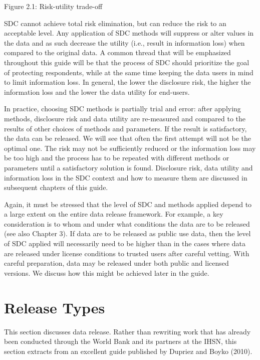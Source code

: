 \documentclass[letterpaper,10pt,english]{sphinxmanual}
\begin{document}
Figure 2.1: Risk-utility trade-off

SDC cannot achieve total risk elimination, but can reduce the risk to an
acceptable level. Any application of SDC methods will suppress or alter
values in the data and as such decrease the utility (i.e., result in
information loss) when compared to the original data. A common thread
that will be emphasized throughout this guide will be that the process
of SDC should prioritize the goal of protecting respondents, while at
the same time keeping the data users in mind to limit information loss.
In general, the lower the disclosure risk, the higher the information
loss and the lower the data utility for end-users.

In practice, choosing SDC methods is partially trial and error: after
applying methods, disclosure risk and data utility are re-measured and
compared to the results of other choices of methods and parameters. If
the result is satisfactory, the data can be released. We will see that
often the first attempt will not be the optimal one. The risk may not be
sufficiently reduced or the information loss may be too high and the
process has to be repeated with different methods or parameters until a
satisfactory solution is found. Disclosure risk, data utility and
information loss in the SDC context and how to measure them are
discussed in subsequent chapters of this guide.

Again, it must be stressed that the level of SDC and methods applied
depend to a large extent on the entire data release framework. For
example, a key consideration is to whom and under what conditions the
data are to be released (see also Chapter 3). If data are to be released
as public use data, then the level of SDC applied will necessarily need
to be higher than in the cases where data are released under license
conditions to trusted users after careful vetting. With careful
preparation, data may be released under both public and licensed
versions. We discuss how this might be achieved later in the guide.


\section{Release Types}
\label{\detokenize{SDC_intro:release-types}}
This section discusses data release. Rather than rewriting work that has
already been conducted through the World Bank and its partners at the
IHSN, this section extracts from an excellent guide published by Dupriez
and Boyko (2010).
\end{document}
